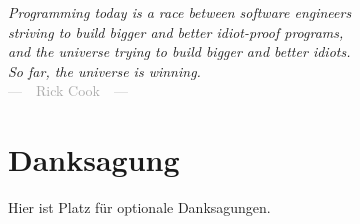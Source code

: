 \begin{flushright}{\slshape
    Programming today is a race between software engineers \\
    striving to build bigger and better idiot-proof programs, \\
    and the universe trying to build bigger and better idiots. \\
    So far, the universe is winning. } \\ \medskip
    \textcolor{darkgray}{---~~Rick Cook~~---}
\end{flushright}



\bigskip

\begingroup
\let\clearpage\relax
\let\cleardoublepage\relax
\let\cleardoublepage\relax
\chapter*{Danksagung}
Hier ist Platz für optionale Danksagungen.


\endgroup
